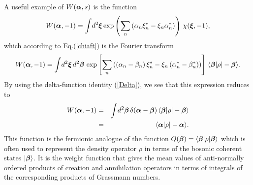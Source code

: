\documentclass[12pt]{article}
\def\beq{\begin{equation}}
\def\eeq{\end{equation}}
\def\bea{\begin{eqnarray}}
\def\eea{\end{eqnarray}}
\def\a{\alpha}
\def\ba{{\mbox{\boldmath$\alpha$}}}
\def\sa{\alpha^*}
\def\b{\beta}
\def\bb{{\mbox{\boldmath$\beta$}}}
\def\sb{\beta^*}
\def\d{\delta}
\def\x{\xi}
\def\bx{{\mbox{\boldmath$\xi$}}}
\def\xs{\xi^*}
\def\nn{\nonumber}
\def\ops{operators }
\def\ani{annihilation }
\def\cre{creation }
\begin{document}
\par
A useful example of $ W( \ba , s ) $ is the function 
\beq
W( \ba , -1 ) = \int \! d^2\bx \exp \left( \sum_n
\left( \a_n \xs_n - \x_n \sa _n \right) \right)
\, \chi ( \bx , -1 ) ,
\label {WA}
\eeq
which according to Eq.(\ref {chiaft}) is the Fourier transform
\beq
W( \ba , -1 ) = \int \! d^2\bx \, d^2\bb \,
\exp \left[ \sum_n
\left( \left( \a_n -\b_n \right) \xs_n 
- \x_n \left( \sa_n - \sb_n \right) \right) \right]
\, \langle \bb | \rho | - \bb \rangle .
\label {WA2}
\eeq
By using the delta-function identity (\ref {Delta}),
we see that this expression reduces to
\bea
W( \ba , -1 ) & = & \int \! d^2\bb \,
\d ( \ba - \bb ) 
\, \langle \bb | \rho | - \bb \rangle \nn\\
& = & \langle \ba | \rho | - \ba \rangle .
\label {WA3}
\eea
This function is the fermionic analogue
of the function $ Q( \bb ) = \langle \bb | \rho | \bb \rangle $
which is often used to represent the density operator $ \rho $
in terms of the bosonic coherent states $ | \bb \rangle $. 
It is the weight function that gives the mean values
of anti-normally ordered products of \cre and \ani \ops 
in terms of integrals of the corresponding products
of Grassmann numbers.
\end{document}
